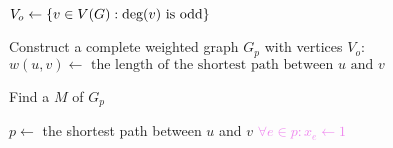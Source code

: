 
\begin{algorithm}[H]
  \begin{algorithmic}[1]
    \State $V_{o} \gets \left\{v \in V(G): \text{deg}(v) \text{ is odd}\right\}$

    \pause
    \Statex
    \State Construct a complete weighted graph $G_{p}$ with vertices $V_{o}$:
      \State $w(u,v) \gets \text{ the length of the shortest path between $u$ and $v$}$ 
    \EndFor

    \pause
    \Statex
    \State Find a  $M$ of $G_p$

    \pause
    \Statex
      \State $p \gets$ the shortest path between $u$ and $v$
      \State \textcolor<5->{violet}{$\forall e \in p: x_e \gets 1$}
    \EndFor
  \end{algorithmic}
\end{algorithm}
